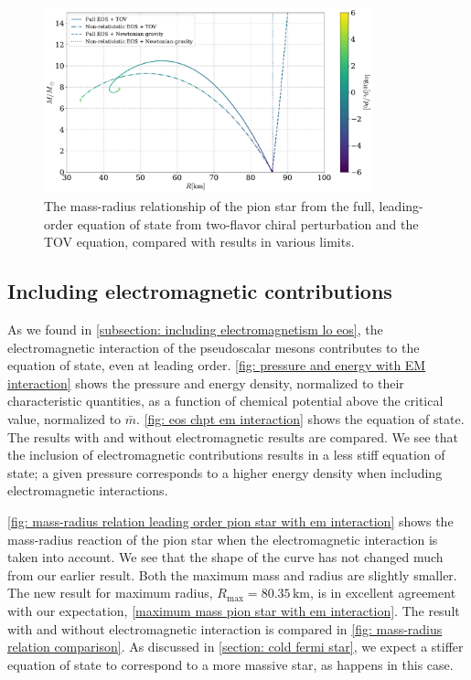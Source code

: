 \begin{figure}[!htb]
    \centering
    \includegraphics[width=0.85\textwidth]{../scripts/figurer/pion_star/mass_radius_comparison.pdf}
    \caption{
        The mass-radius relationship of the pion star from the full, leading-order equation of state from two-flavor chiral perturbation and the TOV equation, compared with results in various limits.
        }
        \label{fig: mass-radius relation pion star comparison}
\end{figure}



\FloatBarrier
\subsection{Including electromagnetic contributions}

As we found in \autoref{subsection: including electromagnetism lo eos}, the electromagnetic interaction of the pseudoscalar mesons contributes to the equation of state, even at leading order.
\autoref{fig: pressure and energy with EM interaction} shows the pressure and energy density, normalized to their characteristic quantities, as a function of chemical potential above the critical value, normalized to $\bar m$.
\autoref{fig: eos chpt em interaction} shows the equation of state.
The results with and without electromagnetic results are compared.
We see that the inclusion of electromagnetic contributions results in a less stiff equation of state; a given pressure corresponds to a higher energy density when including electromagnetic interactions.

\autoref{fig: mass-radius relation leading order pion star with em interaction} shows the mass-radius reaction of the pion star when the electromagnetic interaction is taken into account.
We see that the shape of the curve has not changed much from our earlier result. 
Both the maximum mass and radius are slightly smaller.
The new result for maximum radius, $R_\text{max} = 80.35 \, \text{km}$, is in excellent agreement with our expectation, \autoref{maximum mass pion star with em interaction}.
The result with and without electromagnetic interaction is compared in \autoref{fig: mass-radius relation comparison}.
As discussed in \autoref{section: cold fermi star}, we expect a stiffer equation of state to correspond to a more massive star, as happens in this case.

